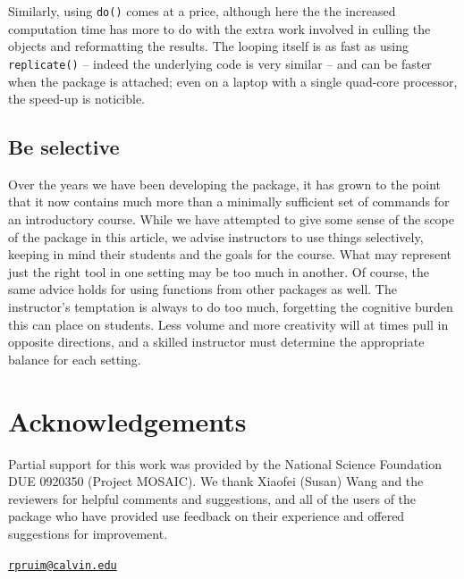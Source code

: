 Similarly, using \texttt{do()} comes at a price, although here the the
increased computation time has more to do with the extra work involved
in culling the objects and reformatting the results. The looping itself
is as fast as using \texttt{replicate()} -- indeed the underlying code
is very similar -- and can be faster when the  package
is attached; even on a laptop with a single quad-core processor, the
speed-up is noticible.

\subsection{Be selective}\label{be-selective}

Over the years we have been developing the  package, it has
grown to the point that it now contains much more than a minimally
sufficient set of commands for an introductory course. While we have
attempted to give some sense of the scope of the package in this
article, we advise instructors to use things selectively, keeping in
mind their students and the goals for the course. What may represent
just the right tool in one setting may be too much in another. Of
course, the same advice holds for using functions from other packages as
well. The instructor's temptation is always to do too much, forgetting
the cognitive burden this can place on students. Less volume and more
creativity will at times pull in opposite directions, and a skilled
instructor must determine the appropriate balance for each setting.

\section{Acknowledgements}\label{acknowledgements}

Partial support for this work was provided by the National Science
Foundation DUE 0920350 (Project MOSAIC). We thank Xiaofei (Susan) Wang
and the reviewers for helpful comments and suggestions, and all of the
users of the  package who have provided use feedback on
their experience and offered suggestions for improvement.



\address{%
Randall Pruim\\
Calvin College\\
Department of Mathematics and Statistics\\ 3201 Burton St SE\\ Grand Rapids, MI 49546\\
}
\href{mailto:rpruim@calvin.edu}{\nolinkurl{rpruim@calvin.edu}}

